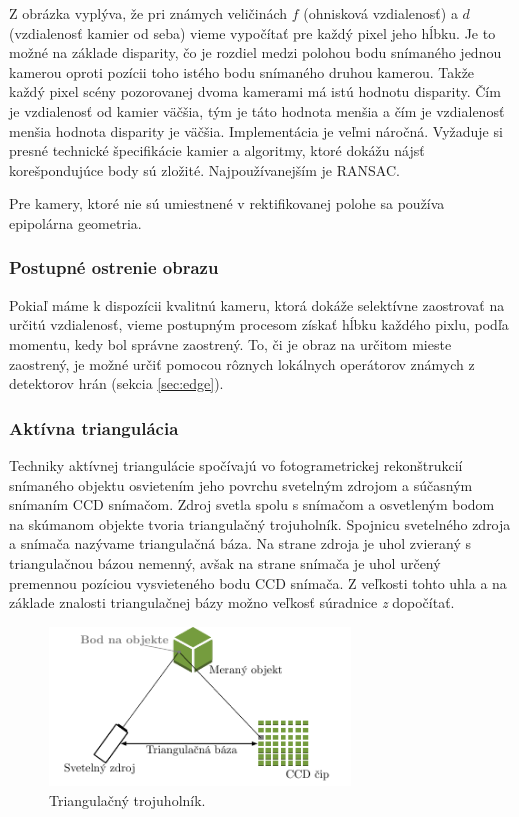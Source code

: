Z obrázka vyplýva, že pri známych veličinách $f$ (ohnisková vzdialenosť) a $d$ (vzdialenosť kamier od seba) vieme vypočítať pre každý pixel jeho hĺbku. Je to možné na základe disparity, čo je rozdiel medzi polohou bodu snímaného jednou kamerou oproti pozícii toho istého bodu snímaného druhou kamerou. Takže každý pixel scény pozorovanej dvoma kamerami má istú hodnotu disparity. Čím je vzdialenosť od kamier väčšia, tým je táto hodnota menšia a čím je vzdialenosť menšia hodnota disparity je väčšia. Implementácia je veľmi náročná. Vyžaduje si presné technické špecifikácie kamier a algoritmy, ktoré dokážu nájsť korešpondujúce body sú zložité. Najpoužívanejším je RANSAC. \cite{pocitacove_videnie_v_praxi} 

Pre kamery, ktoré nie sú umiestnené v rektifikovanej  polohe sa používa epipolárna geometria. 

\subsubsection{Postupné ostrenie obrazu }
Pokiaľ máme k dispozícii kvalitnú kameru, ktorá dokáže selektívne zaostrovať na určitú vzdialenosť, vieme postupným procesom získať hĺbku každého pixlu, podľa momentu, kedy bol správne zaostrený. To, či je obraz na určitom mieste zaostrený, je možné určiť pomocou rôznych lokálnych operátorov známych z detektorov hrán (sekcia \ref{sec:edge}). \cite{pocitacove_videnie_v_praxi} 


\subsubsection{Aktívna triangulácia }
\label{sec:activeDeep}
Techniky aktívnej triangulácie spočívajú vo fotogrametrickej rekonštrukcií snímaného objektu osvietením jeho povrchu svetelným zdrojom a súčasným snímaním CCD snímačom. Zdroj svetla spolu s snímačom a osvetleným bodom na skúmanom objekte tvoria triangulačný trojuholník. Spojnicu svetelného zdroja a snímača nazývame triangulačná báza. Na strane zdroja je uhol zvieraný s triangulačnou bázou nemenný, avšak na strane snímača je uhol určený premennou pozíciou vysvieteného bodu CCD snímača. Z veľkosti tohto uhla a na základe znalosti triangulačnej bázy možno veľkosť súradnice \textit{z} dopočítať. \cite{opticke_metody_merania}

 \begin{figure}[H]
\begin{center}
    \includegraphics[width=8cm]{images/activTriang}
    \caption{Triangulačný trojuholník.}
	\end{center}
\end{figure}

